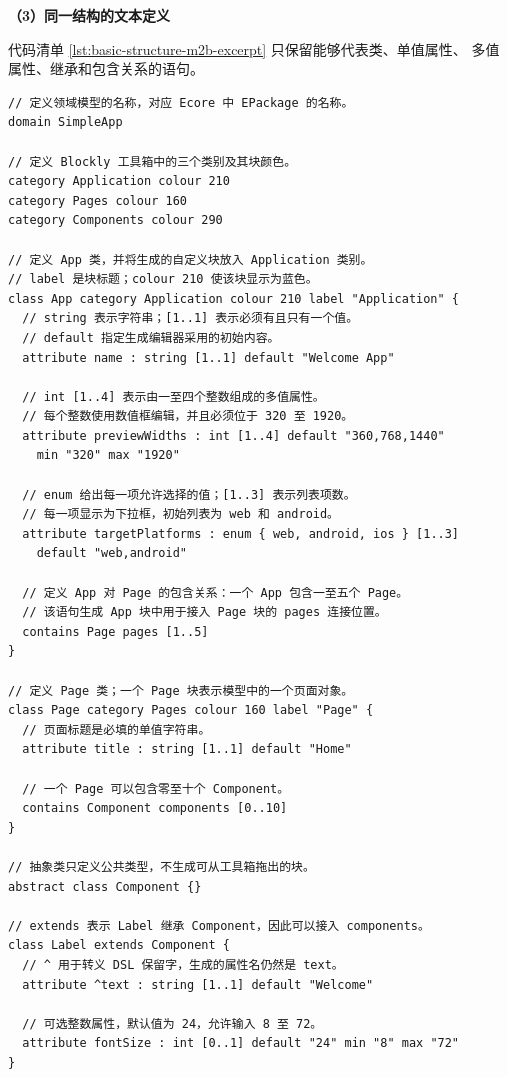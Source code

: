 \textbf{（3）同一结构的文本定义}

代码清单 \ref{lst:basic-structure-m2b-excerpt} 只保留能够代表类、单值属性、
多值属性、继承和包含关系的语句。

\begin{lstlisting}[style=tfmm2b, captionpos=t, caption={\texttt{basicStructure.m2b} 的关键语句}, label={lst:basic-structure-m2b-excerpt}]
// 定义领域模型的名称，对应 Ecore 中 EPackage 的名称。
domain SimpleApp

// 定义 Blockly 工具箱中的三个类别及其块颜色。
category Application colour 210
category Pages colour 160
category Components colour 290

// 定义 App 类，并将生成的自定义块放入 Application 类别。
// label 是块标题；colour 210 使该块显示为蓝色。
class App category Application colour 210 label "Application" {
  // string 表示字符串；[1..1] 表示必须有且只有一个值。
  // default 指定生成编辑器采用的初始内容。
  attribute name : string [1..1] default "Welcome App"

  // int [1..4] 表示由一至四个整数组成的多值属性。
  // 每个整数使用数值框编辑，并且必须位于 320 至 1920。
  attribute previewWidths : int [1..4] default "360,768,1440"
    min "320" max "1920"

  // enum 给出每一项允许选择的值；[1..3] 表示列表项数。
  // 每一项显示为下拉框，初始列表为 web 和 android。
  attribute targetPlatforms : enum { web, android, ios } [1..3]
    default "web,android"

  // 定义 App 对 Page 的包含关系：一个 App 包含一至五个 Page。
  // 该语句生成 App 块中用于接入 Page 块的 pages 连接位置。
  contains Page pages [1..5]
}

// 定义 Page 类；一个 Page 块表示模型中的一个页面对象。
class Page category Pages colour 160 label "Page" {
  // 页面标题是必填的单值字符串。
  attribute title : string [1..1] default "Home"

  // 一个 Page 可以包含零至十个 Component。
  contains Component components [0..10]
}

// 抽象类只定义公共类型，不生成可从工具箱拖出的块。
abstract class Component {}

// extends 表示 Label 继承 Component，因此可以接入 components。
class Label extends Component {
  // ^ 用于转义 DSL 保留字，生成的属性名仍然是 text。
  attribute ^text : string [1..1] default "Welcome"

  // 可选整数属性，默认值为 24，允许输入 8 至 72。
  attribute fontSize : int [0..1] default "24" min "8" max "72"
}
\end{lstlisting}

